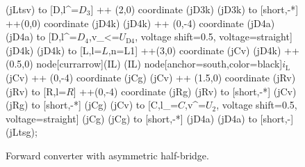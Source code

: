 \begin{figure}[ht]
\begin{center}
\begin{circuitikz}
                    (jLtsv) to  [D,l^=$D_3$] ++ (2,0) coordinate (jD3k)
                    (jD3k)  to [short,-*] ++(0,0) coordinate (jD4k)
                    (jD4k)  ++ (0,-4) coordinate (jD4a)
                    (jD4a) to  [D,l^=$D_\mathrm{4}$,v_<=$U_\text{D4}$, voltage shift=0.5, voltage=straight]  (jD4k)                    
                    (jD4k) to [L,l=$L$,n=L1] ++(3,0) coordinate (jCv)
                    (jD4k) ++(0.5,0) node[currarrow](IL){}  
                    (IL)  node[anchor=south,color=black]{$i_\mathrm{L}$}
                    (jCv) ++ (0,-4) coordinate (jCg)                    
                    (jCv) ++ (1.5,0) coordinate (jRv)                    
                    (jRv) to [R,l=$R$] ++(0,-4) coordinate (jRg)
                    (jRv)  to [short,-*] (jCv)
                    (jRg)  to [short,-*] (jCg)
                    (jCv) to  [C,l_=$C$,v^=$U_\text{2}$, voltage shift=0.5, voltage=straight] (jCg)
                    (jCg) to [short,-*] (jD4a)
                    (jD4a) to [short,-] (jLtsg);

                \end{circuitikz}
    \end{center}
    \caption{Forward converter with asymmetric half-bridge.}
    \label{fig:ex04_ForwardConverterWithAsymHalfBridge}
\end{figure}

